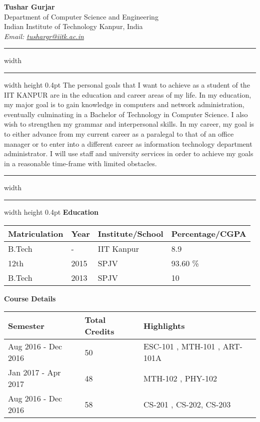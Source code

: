\documentclass{article}
\begin{document}
\begin{flushleft}
\hspace{2mm}\textbf{Tushar Gurjar}\\
\hspace{2mm}Department of Computer Science and Engineering\\
\hspace{2mm}Indian Institute of Technology Kanpur, India\\
\hspace{2mm}\textit{Email: \href{mailto:tushargr@iitk.ac.in}{tushargr@iitk.ac.in}}
\end{flushleft}
\hrule width \hsize \kern 1mm \hrule width \hsize height 0.4pt 
The personal goals that I want to achieve as a student of the IIT KANPUR are in the education and career areas of my life. In my education, my major goal is to gain knowledge in computers and network administration, eventually culminating in a Bachelor of Technology in Computer Science. I also wish to strengthen my grammar and interpersonal skills. In my career, my goal is to either advance from my current career as a paralegal to that of an office manager or to enter into a different career as information technology department administrator. I will use staff and university services in order to achieve my goals in a reasonable time-frame with limited obstacles.
\hrule width \hsize \kern 1mm \hrule width \hsize height 0.4pt
\vspace{4mm}
\noindent\textbf{Education }\newline\newline
\begin{tabular}{|l|l|l|l|}
\hline
Matriculation & Year & Institute/School & Percentage/CGPA\\
\hline
 B.Tech & - & IIT Kanpur & 8.9\\
 \hline
 12th & 2015 & SPJV & 93.60 \%\\
 \hline
 B.Tech & 2013 & SPJV & 10\\
 \hline
\end{tabular}\newline\newline\newline
\textbf{Course Details}\newline\newline
\begin{tabular}{|l|l|l|}
 \hline
Semester & Total Credits & Highlights\\
\hline
Aug 2016 - Dec 2016  &  50  & ESC-101 , MTH-101 , ART-101A\\
 \hline
 Jan 2017 - Apr 2017  &  48  & MTH-102 , PHY-102\\
 \hline
Aug 2016 - Dec 2016  &  58  & CS-201 , CS-202, CS-203\\
 \hline
\end{tabular}
\end{document}
